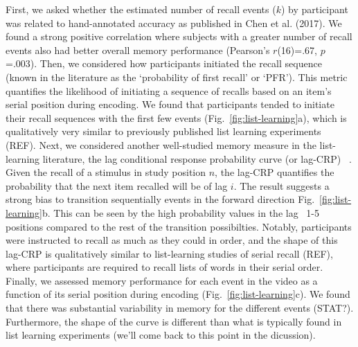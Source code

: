 \documentclass{article}
\begin{document}
{First, we asked whether the estimated number of recall events ($k$) by participant was related to hand-annotated accuracy as published in Chen et al. (2017).  We found a strong positive correlation where subjects with a greater number of recall events also had better overall memory performance (Pearson's $r$(16)=.67, $p$=.003). Then, we considered how participants initiated the recall sequence (known in the literature as the `probability of first recall' or `PFR'). This metric quantifies the likelihood of initiating a sequence of recalls based on an item's serial position during encoding. We found that participants tended to initiate their recall sequences with the first few events (Fig.~\ref{fig:list-learning}a), which is qualitatively very similar to previously published list learning experiments (REF). Next, we considered another well-studied memory measure in the list-learning literature, the lag conditional response probability curve (or lag-CRP) ~\citep{Kaha96}. Given the recall of a stimulus in study position $n$, the lag-CRP quantifies the probability that the next item recalled will be of lag $i$. The result suggests a strong bias to transition sequentially events in the forward direction Fig.~\ref{fig:list-learning}b. This can be seen by the high probability values in the lag ~1-5 positions compared to the rest of the transition possibilties. Notably, participants were instructed to recall as much as they could in order, and the shape of this lag-CRP is qualitatively similar to list-learning studies of serial recall (REF), where participants are required to recall lists of words in their serial order. Finally, we assessed memory performance for each event in the video as a function of its serial position during encoding (Fig.~\ref{fig:list-learning}c). We found that there was substantial variability in memory for the different events (STAT?). Furthermore, the shape of the curve is different than what is typically found in list learning experiments (we'll come back to this point in the dicussion).

}
\end{document}
